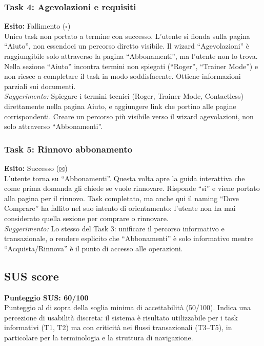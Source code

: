 ﻿\documentclass[11pt,a4paper]{article}
\begin{document}
\begin{tcolorbox}[base]
\vspace{0.3cm}

\subsubsection*{Task 4: Agevolazioni e requisiti}
\noindent\textbf{Esito:} Fallimento ($\square$)\\[0.2cm]
Unico task non portato a termine con successo. L'utente si
fionda sulla pagina ``Aiuto'', non essendoci un percorso
diretto visibile. Il wizard ``Agevolazioni'' è raggiungibile
solo attraverso la pagina ``Abbonamenti'', ma l'utente non
lo trova. Nella sezione ``Aiuto'' incontra termini non
spiegati (``Roger'', ``Trainer Mode'') e non riesce a
completare il task in modo soddisfacente. Ottiene
informazioni parziali sui documenti.\\[0.2cm]
\textit{Suggerimento:} Spiegare i termini tecnici (Roger,
Trainer Mode, Contactless) direttamente nella pagina Aiuto,
e aggiungere link che portino alle pagine corrispondenti.
Creare un percorso più visibile verso il wizard agevolazioni,
non solo attraverso ``Abbonamenti''.

\vspace{0.3cm}

\subsubsection*{Task 5: Rinnovo abbonamento}
\noindent\textbf{Esito:} Successo ($\boxtimes$)\\[0.2cm]
L'utente torna su ``Abbonamenti''. Questa volta apre la
guida interattiva che come prima domanda gli chiede se
vuole rinnovare. Risponde ``sì'' e viene portato alla pagina
per il rinnovo. Task completato, ma anche qui il naming
``Dove Comprare'' ha fallito nel suo intento di orientamento:
l'utente non ha mai considerato quella sezione per comprare
o rinnovare.\\[0.2cm]
\textit{Suggerimento:} Lo stesso del Task 3: unificare il
percorso informativo e transazionale, o rendere esplicito
che ``Abbonamenti'' è solo informativo mentre ``Acquista/Rinnova''
è il punto di accesso alle operazioni.

\end{tcolorbox}

\subsection*{SUS score}
\begin{tcolorbox}[base]
\textbf{Punteggio SUS: 60/100}\\[0.2cm]
\small Punteggio al di sopra della soglia minima di
accettabilità (50/100). Indica una percezione di usabilità
discreta: il sistema è risultato utilizzabile per i task
informativi (T1, T2) ma con criticità nei flussi
transazionali (T3--T5), in particolare per la terminologia
e la struttura di navigazione.
\end{tcolorbox}
\end{document}

